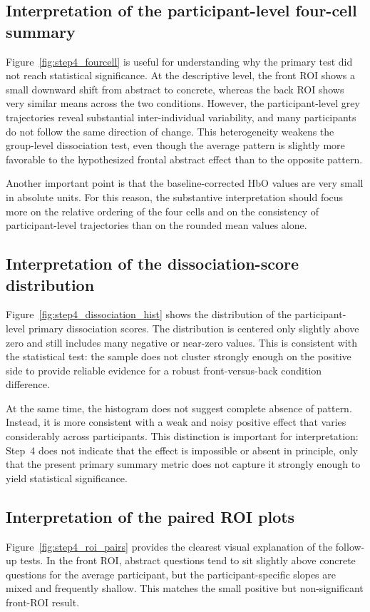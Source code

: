 \subsection{Interpretation of the participant-level four-cell summary}
Figure~\ref{fig:step4_fourcell} is useful for understanding why the primary test did not reach
statistical significance.
At the descriptive level, the front ROI shows a small downward shift from abstract to concrete,
whereas the back ROI shows very similar means across the two conditions.
However, the participant-level grey trajectories reveal substantial inter-individual variability, and
many participants do not follow the same direction of change.
This heterogeneity weakens the group-level dissociation test, even though the average pattern is
slightly more favorable to the hypothesized frontal abstract effect than to the opposite pattern.

Another important point is that the baseline-corrected HbO values are very small in absolute units.
For this reason, the substantive interpretation should focus more on the relative ordering of the four
cells and on the consistency of participant-level trajectories than on the rounded mean values alone.

\subsection{Interpretation of the dissociation-score distribution}
Figure~\ref{fig:step4_dissociation_hist} shows the distribution of the participant-level primary
dissociation scores.
The distribution is centered only slightly above zero and still includes many negative or near-zero
values.
This is consistent with the statistical test: the sample does not cluster strongly enough on the
positive side to provide reliable evidence for a robust front-versus-back condition difference.

At the same time, the histogram does not suggest complete absence of pattern.
Instead, it is more consistent with a weak and noisy positive effect that varies considerably across
participants.
This distinction is important for interpretation: Step~4 does not indicate that the effect is impossible
or absent in principle, only that the present primary summary metric does not capture it strongly
enough to yield statistical significance.

\subsection{Interpretation of the paired ROI plots}
Figure~\ref{fig:step4_roi_pairs} provides the clearest visual explanation of the follow-up tests.
In the front ROI, abstract questions tend to sit slightly above concrete questions for the average
participant, but the participant-specific slopes are mixed and frequently shallow.
This matches the small positive but non-significant front-ROI result.

